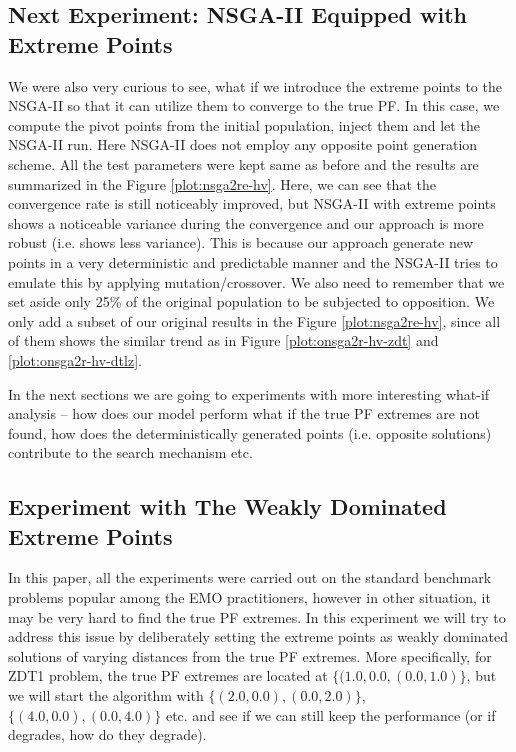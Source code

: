 \documentclass{sig-alternate-05-2015}
\begin{document}
\subsection{Next Experiment: NSGA-II Equipped with Extreme Points}
\label{subsec:nsga2re}
We were also very curious to see, what if we introduce the extreme points to the NSGA-II so that it can utilize them to converge to the true PF. In this case, we compute the pivot points from the initial population, inject them and let the NSGA-II run. Here NSGA-II does not employ any opposite point generation scheme. All the test parameters were kept same as before and the results are summarized in the Figure \ref{plot:nsga2re-hv}. Here, we can see that the convergence rate is still noticeably improved, but NSGA-II with extreme points shows a noticeable variance during the convergence and our approach is more robust (i.e. shows less variance). This is because our approach generate new points in a very deterministic and predictable manner and the NSGA-II tries to emulate this by applying mutation/crossover. We also need to remember that we set aside only 25\% of the original population to be subjected to opposition. We only add a subset of our original results in the Figure \ref{plot:nsga2re-hv}, since all of them shows the similar trend as in Figure \ref{plot:onsga2r-hv-zdt} and \ref{plot:onsga2r-hv-dtlz}.

In the next sections we are going to experiments with more interesting what-if analysis -- how does our model perform what if the true PF extremes are not found, how does the deterministically generated points (i.e. opposite solutions) contribute to the search mechanism etc.

\subsection{Experiment with The Weakly Dominated Extreme Points}
\label{sec:weak-extremes}
In this paper, all the experiments were carried out on the standard benchmark problems popular among the EMO practitioners, however in other situation, it may be very hard to find the true PF extremes. In this experiment we will try to address this issue by deliberately setting the extreme points as weakly dominated solutions of varying distances from the true PF extremes. More specifically, for ZDT1 problem, the true PF extremes are located at \(\{(1.0, 0.0, (0.0, 1.0)\}\), but we will start the algorithm with \(\{(2.0, 0.0), (0.0, 2.0)\}\), \(\{(4.0, 0.0), (0.0, 4.0)\}\) etc. and see if we can still keep the performance (or if degrades, how do they degrade).
\end{document}
